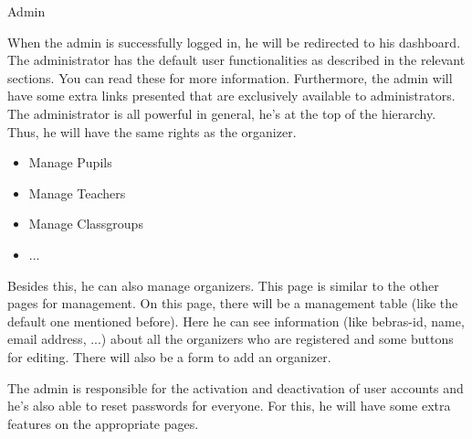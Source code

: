 \begin{section}{Admin}

When the admin is successfully logged in, he will be redirected to his dashboard. The administrator has the default user functionalities as described in the relevant sections. You can read these for more information. Furthermore, the admin will have some extra links presented that are exclusively available to administrators. 
\\

The administrator is all powerful in general, he's at the top of the hierarchy. Thus, he will have the same rights as the organizer.
\begin{itemize}
\item Manage Pupils
\item Manage Teachers
\item Manage Classgroups
\item ...
\end{itemize}

Besides this, he can also manage organizers. This page is similar to the other pages for management. On this page, there will be a management table (like the default one mentioned before). Here he can see information (like bebras-id, name, email address, ...) about all the organizers who are registered and some buttons for editing. There will also be a form to add an organizer.

The admin is responsible for the activation and deactivation of user accounts and he's also able to reset passwords for everyone. For this, he will have some extra features on the appropriate pages.

\end{section}
